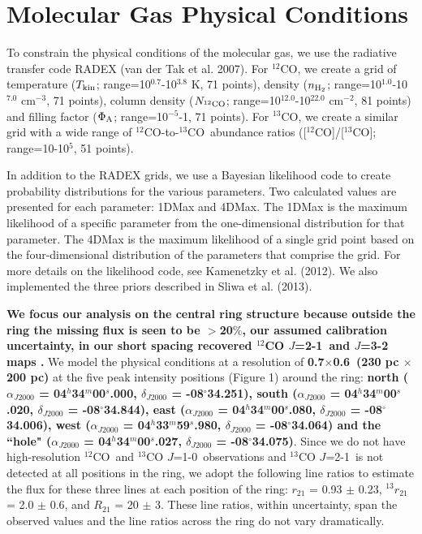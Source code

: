 \documentclass[preprint, 11pt]{aastex}
\newcommand{\tco}{$^{13}$CO}
\newcommand{\co}{$^{12}$CO}
\newcommand{\tcoone}{$^{13}$CO $J$=1-0}
\newcommand{\cotwo}{$^{12}$CO $J$=2-1}
\newcommand{\tcotwo}{$^{13}$CO $J$=2-1}
\newcommand{\tkin}{$T_{\rm{kin}}$}
\newcommand{\nhtwo}{$n_{\rm{H_{2}}}$}
\newcommand{\nco}{$N_{\rm{^{12}CO}}$}
\newcommand{\ff}{$\Phi_{\rm{A}}$}
\newcommand{\xco}{[$^{12}$CO]/[$^{13}$CO]}
\begin{document}
\section{Molecular Gas Physical Conditions}

To constrain the physical conditions of the molecular gas, we use the radiative transfer code RADEX (van der Tak et al. 2007)\nocite{Vandertak2007}. For \co, we create a grid of temperature (\tkin; range=10$^{0.7}$-10$^{3.8}$ K, 71 points), density (\nhtwo; range=10$^{1.0}$-10$^{7.0}$ cm$^{-3}$, 71 points), column density (\nco; range=10$^{12.0}$-10$^{22.0}$ cm$^{-2}$, 81 points) and filling factor (\ff; range=10$^{-5}$-1, 71 points). For \tco, we create a similar grid with a wide range of  \co-to-\tco\ abundance ratios (\xco; range=10-10$^{5}$, 51 points).

In addition to the RADEX grids, we use a Bayesian likelihood code to create probability distributions for the various parameters. Two calculated values are presented for each parameter: 1DMax and 4DMax. The 1DMax is the maximum likelihood of a specific parameter from the one-dimensional distribution for that parameter. The 4DMax is the maximum likelihood of a single grid point based on the four-dimensional distribution of the parameters that comprise the grid. For more details on the likelihood code, see Kamenetzky et al. (2012)\nocite{Kamenetzky2012}. We also implemented the three priors described in Sliwa et al. (2013)\nocite{Sliwa2013}. 


\textbf{We focus our analysis on the central ring structure because outside the ring the missing flux is seen to be $>$20$\%$, our assumed calibration uncertainty, in our short spacing recovered \cotwo\ and $J$=3-2 maps .} We model the physical conditions at a resolution of \textbf{0.7\arcsec$\times$0.6\arcsec\ (230 pc $\times$ 200 pc)} at the five peak intensity positions (Figure 1) around the ring: 
\textbf{north ($\alpha_{J2000}$ = 04$^{h}$34$^{m}$00$^{s}$.000, $\delta_{J2000}$ = -08$^{\circ}$34\arcsec.251), 
south ($\alpha_{J2000}$ = 04$^{h}$34$^{m}$00$^{s}$.020, $\delta_{J2000}$ = -08$^{\circ}$34\arcsec.844), 
east ($\alpha_{J2000}$ = 04$^{h}$34$^{m}$00$^{s}$.080, $\delta_{J2000}$ = -08$^{\circ}$34\arcsec.006), 
west ($\alpha_{J2000}$ = 04$^{h}$33$^{m}$59$^{s}$.980, $\delta_{J2000}$ = -08$^{\circ}$34\arcsec.064) 
and the ``hole" ($\alpha_{J2000}$ = 04$^{h}$34$^{m}$00$^{s}$.027, $\delta_{J2000}$ = -08$^{\circ}$34\arcsec.075)}. Since we do not have high-resolution \co\ and \tcoone\ observations and \tcotwo\ is not detected at all positions in the ring, we adopt the following line ratios to estimate the flux for these three lines at each position of the ring: $r_{21}$ = 0.93 $\pm$ 0.23, $^{13}r_{21}$ = 2.0 $\pm$ 0.6, and $R_{21}$ = 20 $\pm$ 3. These line ratios, within uncertainty, span the observed values and the line ratios across the ring do not vary dramatically. 
\end{document}
